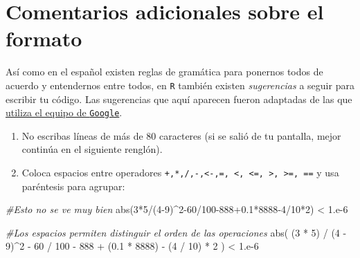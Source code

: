 \documentclass[
]{book}
\newenvironment{Shaded}{\begin{snugshade}}{\end{snugshade}}
\newcommand{\CommentTok}[1]{\textcolor[rgb]{0.56,0.35,0.01}{\textit{#1}}}
\newcommand{\DecValTok}[1]{\textcolor[rgb]{0.00,0.00,0.81}{#1}}
\newcommand{\FloatTok}[1]{\textcolor[rgb]{0.00,0.00,0.81}{#1}}
\newcommand{\FunctionTok}[1]{\textcolor[rgb]{0.00,0.00,0.00}{#1}}
\newcommand{\NormalTok}[1]{#1}
\newcommand{\SpecialCharTok}[1]{\textcolor[rgb]{0.00,0.00,0.00}{#1}}
\begin{document}
\hypertarget{comentarios-adicionales-sobre-el-formato}{%
\section{Comentarios adicionales sobre el formato}\label{comentarios-adicionales-sobre-el-formato}}

Así como en el español existen reglas de gramática para ponernos todos de acuerdo y entendernos entre todos, en \texttt{R} también existen \emph{sugerencias} a seguir para escribir tu código. Las sugerencias que aquí aparecen fueron adaptadas de las que \href{https://google.github.io/styleguide/Rguide.xml}{utiliza el equipo de \texttt{Google}}.

\begin{enumerate}
\def\labelenumi{\arabic{enumi}.}
\item
  No escribas líneas de más de 80 caracteres (si se salió de tu pantalla, mejor continúa en el siguiente renglón).
\item
  Coloca espacios entre operadores \texttt{+,*,/,-,\textless{}-,=,\ \textless{},\ \textless{}=,\ \textgreater{},\ \textgreater{}=,\ ==} y usa paréntesis para agrupar:
\end{enumerate}

\begin{Shaded}
\begin{Highlighting}[]
\CommentTok{\#Esto no se ve muy bien}
\FunctionTok{abs}\NormalTok{(}\DecValTok{3}\SpecialCharTok{*}\DecValTok{5}\SpecialCharTok{/}\NormalTok{(}\DecValTok{4{-}9}\NormalTok{)}\SpecialCharTok{\^{}}\DecValTok{2{-}60}\SpecialCharTok{/}\DecValTok{100{-}888}\FloatTok{+0.1}\SpecialCharTok{*}\DecValTok{8888{-}4}\SpecialCharTok{/}\DecValTok{10}\SpecialCharTok{*}\DecValTok{2}\NormalTok{) }\SpecialCharTok{\textless{}} \DecValTok{1}\NormalTok{.e}\DecValTok{{-}6}

\CommentTok{\#Los espacios permiten distinguir el orden de las operaciones}
\FunctionTok{abs}\NormalTok{( (}\DecValTok{3} \SpecialCharTok{*} \DecValTok{5}\NormalTok{) }\SpecialCharTok{/}\NormalTok{ (}\DecValTok{4} \SpecialCharTok{{-}} \DecValTok{9}\NormalTok{)}\SpecialCharTok{\^{}}\DecValTok{2} \SpecialCharTok{{-}} \DecValTok{60} \SpecialCharTok{/} \DecValTok{100} \SpecialCharTok{{-}} \DecValTok{888} 
      \SpecialCharTok{+}\NormalTok{ (}\FloatTok{0.1} \SpecialCharTok{*} \DecValTok{8888}\NormalTok{) }\SpecialCharTok{{-}}\NormalTok{ (}\DecValTok{4} \SpecialCharTok{/} \DecValTok{10}\NormalTok{) }\SpecialCharTok{*} \DecValTok{2}\NormalTok{ ) }\SpecialCharTok{\textless{}} \DecValTok{1}\NormalTok{.e}\DecValTok{{-}6}
\end{Highlighting}
\end{Shaded}
\end{document}
